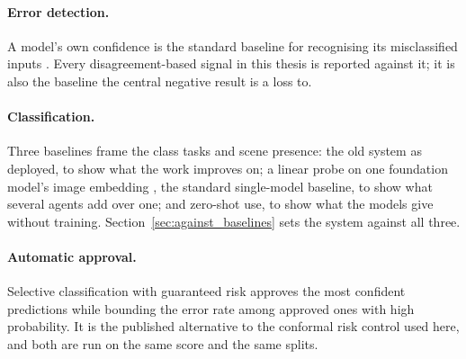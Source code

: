 \documentclass[12pt,a4paper]{report}
\begin{document}
\paragraph{Error detection.} A model's own confidence is the standard baseline for recognising its
misclassified inputs \cite{hendrycks2017baseline}. Every disagreement-based signal in this thesis is
reported against it; it is also the baseline the central negative result is a loss to.

\paragraph{Classification.} Three baselines frame the class tasks and scene presence: the old system as deployed, to show what the work improves on; a linear probe on one foundation model's image embedding \cite{clip2021}, the standard single-model baseline, to show what several agents add over one; and zero-shot use, to show what the models give without training. Section~\ref{sec:against_baselines} sets the system against all three.

\paragraph{Automatic approval.} Selective classification with guaranteed risk
\cite{geifman2017selective} approves the most confident predictions while bounding the error rate among
approved ones with high probability. It is the published alternative to the conformal risk control
\cite{crc2024} used here, and both are run on the same score and the same splits.
\end{document}
